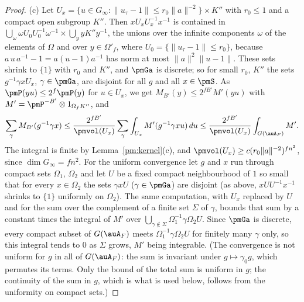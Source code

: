 \documentclass[10pt]{amsart}
\theoremstyle{definition}
\theoremstyle{remark}
\begin{document}
\begin{proof}
(c) Let $U_x=\{u\in G_\infty:\|u_\tau-1\|\le r_0\|a\|^{-2}\}\times K''$ with $r_0\le1$ and a
compact open subgroup $K''$. Then $xU_xU_x^{-1}x^{-1}$ is contained in $\bigcup_{\omega}\omega U_0U_0^{-1}\omega^{-1}\times
\bigcup_{y}yK''y^{-1}$, the unions over the infinite components $\omega$ of the elements of $\Omega$
and over $y\in\Omega'_f$, where $U_0=\{\|u_\tau-1\|\le r_0\}$, because
$a\,u\,a^{-1}-1=a(u-1)a^{-1}$ has norm at most $\|a\|^2\|u-1\|$. These sets shrink to $\{1\}$ with
$r_0$ and $K''$, and $\pmGa$ is discrete; so for small $r_0$, $K''$ the sets $g^{-1}\gamma xU_x$,
$\gamma\in\pmGa$, are disjoint for all $g$ and all $x\in\pmS$. As $\pmP(yu)\le2^f\pmP(y)$ for
$u\in U_x$, we get $M_{B'}(y)\le2^{fB'}M'(yu)$ with $M'=\pmP^{-B'}\otimes1_{\Omega_fK''}$, and
\[
\sum_\gamma M_{B'}(g^{-1}\gamma x)\le\frac{2^{fB'}}{\pmvol(U_x)}\sum_\gamma\int_{U_x}M'(g^{-1}\gamma
xu)\,du\le\frac{2^{fB'}}{\pmvol(U_x)}\int_{G(\auA_F)}M'.
\]
The integral is finite by Lemma~\ref{pm:kernel}(c), and $\pmvol(U_x)\ge c(r_0\|a\|^{-2})^{fn^2}$,
since $\dim G_\infty=fn^2$. For the uniform convergence let $g$ and $x$ run through compact sets $\Omega_1$, $\Omega_2$ and let $U$ be a fixed compact
neighbourhood of $1$ so small that for every $x\in\Omega_2$ the sets $\gamma xU$ ($\gamma\in\pmGa$) are disjoint (as above, $xUU^{-1}x^{-1}$
shrinks to $\{1\}$ uniformly on $\Omega_2$). The same computation, with $U_x$ replaced by $U$ and for the sum over the
complement of a finite set $\Sigma$ of $\gamma$, bounds that sum by a constant times the integral of $M'$ over
$\bigcup_{\gamma\notin\Sigma}\Omega_1^{-1}\gamma\Omega_2U$. Since $\pmGa$ is discrete, every compact subset of $G(\auA_F)$ meets
$\Omega_1^{-1}\gamma\Omega_2U$ for finitely many $\gamma$ only, so this integral tends to $0$ as $\Sigma$ grows, $M'$ being
integrable. (The convergence is not uniform for $g$ in all of $G(\auA_F)$: the sum is invariant under $g\mapsto\gamma_0g$,
which permutes its terms. Only the bound of the total sum is uniform in $g$; the continuity of the sum in $g$, which is
what is used below, follows from the uniformity on compact sets.)
\end{proof}
\end{document}
